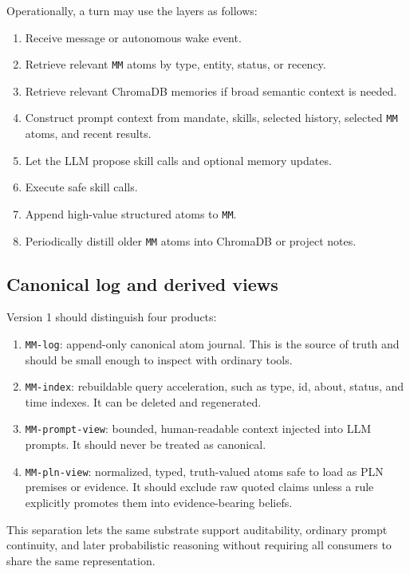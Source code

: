 \documentclass[11pt]{article}
\begin{document}
Operationally, a turn may use the layers as follows:
\begin{enumerate}
  \item Receive message or autonomous wake event.
  \item Retrieve relevant \texttt{MM} atoms by type, entity, status, or recency.
  \item Retrieve relevant ChromaDB memories if broad semantic context is needed.
  \item Construct prompt context from mandate, skills, selected history, selected
        \texttt{MM} atoms, and recent results.
  \item Let the LLM propose skill calls and optional memory updates.
  \item Execute safe skill calls.
  \item Append high-value structured atoms to \texttt{MM}.
  \item Periodically distill older \texttt{MM} atoms into ChromaDB or project notes.
\end{enumerate}

\subsection{Canonical log and derived views}

Version 1 should distinguish four products:
\begin{enumerate}
  \item \texttt{MM-log}: append-only canonical atom journal.  This is the source of
        truth and should be small enough to inspect with ordinary tools.
  \item \texttt{MM-index}: rebuildable query acceleration, such as type, id, about,
        status, and time indexes.  It can be deleted and regenerated.
  \item \texttt{MM-prompt-view}: bounded, human-readable context injected into LLM
        prompts.  It should never be treated as canonical.
  \item \texttt{MM-pln-view}: normalized, typed, truth-valued atoms safe to load as
        PLN premises or evidence.  It should exclude raw quoted claims unless a
        rule explicitly promotes them into evidence-bearing beliefs.
\end{enumerate}

This separation lets the same substrate support auditability, ordinary prompt
continuity, and later probabilistic reasoning without requiring all consumers to
share the same representation.
\end{document}
